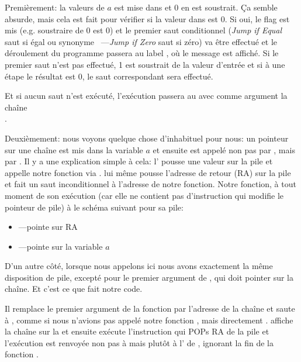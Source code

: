 
Premièrement: la valeurs de $a$ est mise dans \EAX et 0 en est soustrait. Ça semble
absurde, mais cela est fait pour vérifier si la valeur dans \EAX est 0. Si oui, le
flag \ZF est mis (e.g. soustraire de 0 est 0) et le premier saut conditionnel \JE
(\emph{Jump if Equal} saut si égal ou synonyme \JZ~---\emph{Jump if Zero} saut si zéro)
va être effectué et le déroulement du programme passera au label , où
le message  est affiché.
Si le premier saut n'est pas effectué, 1 est soustrait de la valeur d'entrée et si
à une étape le résultat est 0, le saut correspondant sera effectué.

Et si aucun saut n'est exécuté, l'exécution passera au \printf avec comme argument
la chaîne\\ .

\label{jump_to_last_printf}
\myindex{\Stack}

Deuxièmement: nous voyons quelque chose d'inhabituel pour nous: un pointeur sur une
chaîne est mis dans la variable $a$ et ensuite \printf est appelé non pas par \CALL,
mais par \JMP. Il y a une explication simple à cela: l'
pousse une valeur sur la pile et appelle notre fonction via \CALL.
\CALL lui même pousse l'adresse de retour (\ac{RA}) sur la pile et fait un saut
inconditionnel à l'adresse de notre fonction.
Notre fonction, à tout moment de son exécution (car elle ne contient pas d'instruction
qui modifie le pointeur de pile) à le schéma suivant pour sa pile:

\begin{itemize}
\item\ESP---pointe sur \ac{RA}
\item{}---pointe sur la variable $a$
\end{itemize}

D'un autre côté, lorsque nous appelons \printf ici nous avons exactement la même
disposition de pile, excepté pour le premier argument de \printf, qui doit pointer
sur la chaîne. Et c'est ce que fait notre code.

Il remplace le premier argument de la fonction par l'adresse de la chaîne et saute
à \printf, comme si nous n'avions pas appelé notre fonction \ttf, mais directement
\printf.
\printf affiche la chaîne sur la  et ensuite exécute
l'instruction \RET qui POPs \ac{RA} de la pile et l'exécution est renvoyée non pas
à \ttf mais plutôt à l' de \ttf, ignorant la fin de la
fonction \ttf.

